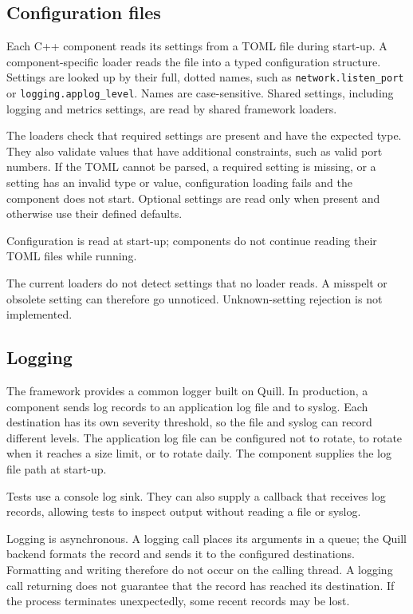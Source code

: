 \subsection{Configuration files}

Each C++ component reads its settings from a TOML file during start-up. A
component-specific loader reads the file into a typed configuration structure.
Settings are looked up by their full, dotted names, such as
\texttt{network.listen\_port} or \texttt{logging.applog\_level}. Names are
case-sensitive. Shared settings, including logging and metrics settings, are
read by shared framework loaders.

The loaders check that required settings are present and have the expected
type. They also validate values that have additional constraints, such as
valid port numbers. If the TOML cannot be parsed, a required setting is
missing, or a setting has an invalid type or value, configuration loading
fails and the component does not start. Optional settings are read only when
present and otherwise use their defined defaults.

Configuration is read at start-up; components do not continue reading their
TOML files while running.

The current loaders do not detect settings that no loader reads. A misspelt or
obsolete setting can therefore go unnoticed. Unknown-setting rejection is not
implemented.

\subsection{Logging}

The framework provides a common logger built on Quill. In production, a
component sends log records to an application log file and to syslog. Each
destination has its own severity threshold, so the file and syslog can record
different levels. The application log file can be configured not to rotate,
to rotate when it reaches a size limit, or to rotate daily. The component
supplies the log file path at start-up.

Tests use a console log sink. They can also supply a callback that receives
log records, allowing tests to inspect output without reading a file or
syslog.

Logging is asynchronous. A logging call places its arguments in a queue; the
Quill backend formats the record and sends it to the configured destinations.
Formatting and writing therefore do not occur on the calling thread. A
logging call returning does not guarantee that the record has reached its
destination. If the process terminates unexpectedly, some recent records may
be lost.

